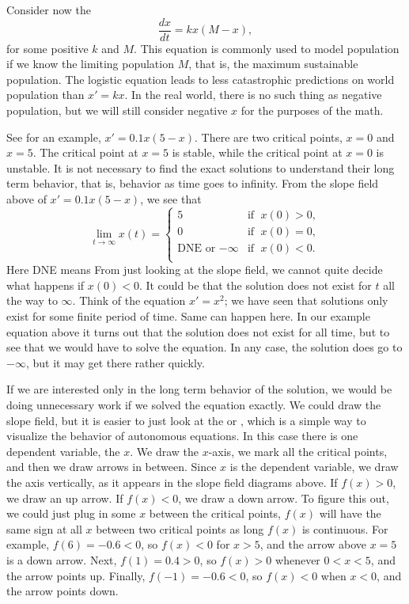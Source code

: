\medskip

Consider now the \emph{}
\begin{equation*}
\frac{dx}{dt} = kx(M-x) ,
\end{equation*}
for some positive $k$ and $M$.  This equation is commonly used to model
population if we know the limiting population $M$, that is, the maximum
sustainable population.  The logistic equation leads to 
less catastrophic
predictions on world population than $x'=kx$.  In the real world, there is no
such thing as negative population, but we will still consider negative $x$ for
the purposes of the math.

See  for an example, $x' = 0.1 x(5-x)$.
There are two critical points, $x=0$ and $x=5$.  The critical point
at $x=5$ is stable, while the critical point at $x=0$ is
unstable.
It is not necessary to find the exact solutions to understand their long
term behavior, that is, behavior as time goes to infinity.
From the slope field above of
$x' = 0.1 x(5-x)$, we 
see that
\begin{equation*}
\lim_{t\to \infty} x(t) = 
\begin{cases}
5 & \text{if } \; x(0) > 0 , \\
0 & \text{if } \; x(0) = 0 , \\
\text{DNE or } {-\infty} & \text{if } \; x(0) < 0 . \\
\end{cases}
\end{equation*}
Here DNE means   From just looking at the slope
field, we
cannot quite decide what happens if $x(0) < 0$.  It could be that the
solution does not exist for $t$ all the way to $\infty$.
Think of the equation $x' = x^2$; we
have seen that solutions only exist for some finite period of time.  Same can happen
here.  In our example equation above it turns out that the
solution does not exist for all time, but to see that we would have to solve
the equation.  In any case, the solution does go to $-\infty$, but it may get
there rather quickly.


If we are interested only in the long term behavior of the solution, 
we would be doing unnecessary work if we solved the
equation exactly.
We could draw the slope field, but
it is easier to just look at the \emph{} or
\emph{}, which is a simple
way to visualize the behavior of
autonomous equations.  In this case there is one dependent variable, the $x$.
We draw the $x$-axis, we mark all the critical points,
and then we draw arrows in
between.  Since $x$ is the dependent variable, we draw the axis vertically,
as it appears in the slope field diagrams above.
If $f(x) > 0$, we draw an up arrow.  If $f(x) < 0$, we draw 
a down arrow.
To figure this out, we could just plug in some $x$ between the critical
points, $f(x)$ will have the same sign at all $x$ between two critical
points as long $f(x)$ is continuous.
For example, $f(6) = -0.6 < 0$, so $f(x) < 0$ for $x > 5$,
and the arrow above $x=5$ is a down
arrow.  Next, $f(1) = 0.4 > 0$, so $f(x) > 0$ whenever $0 < x < 5$, and
the arrow points up.  Finally, $f(-1) = -0.6 < 0$, so $f(x) < 0$ when $x <
0$, and the arrow points down.

